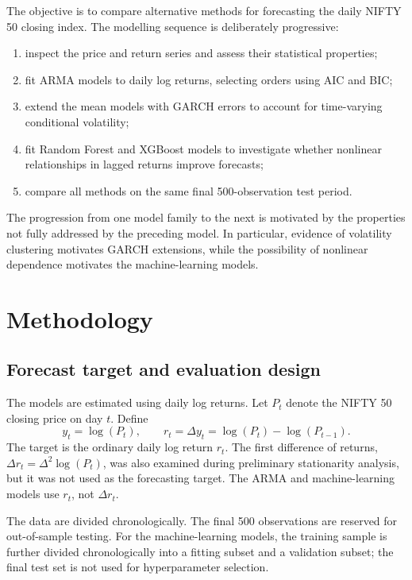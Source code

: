 \documentclass[10pt,a4paper]{article}
\begin{document}
The objective is to compare alternative methods for forecasting the daily NIFTY 50 closing index. The modelling sequence is deliberately progressive:
\begin{enumerate}[leftmargin=2em]
  \item inspect the price and return series and assess their statistical properties;
  \item fit ARMA models to daily log returns, selecting orders using AIC and BIC;
  \item extend the mean models with GARCH errors to account for time-varying conditional volatility;
  \item fit Random Forest and XGBoost models to investigate whether nonlinear relationships in lagged returns improve forecasts;
  \item compare all methods on the same final 500-observation test period.
\end{enumerate}

The progression from one model family to the next is motivated by the properties not fully addressed by the preceding model. In particular, evidence of volatility clustering motivates GARCH extensions, while the possibility of nonlinear dependence motivates the machine-learning models.

\section{Methodology}
\subsection{Forecast target and evaluation design}

The models are estimated using daily log returns. Let $P_t$ denote the NIFTY 50 closing price on day $t$. Define
\begin{equation}
  y_t=\log(P_t), \qquad
  r_t=\Delta y_t=\log(P_t)-\log(P_{t-1}).
  \label{eq:returns}
\end{equation}
The target is the ordinary daily log return $r_t$. The first difference of returns, $\Delta r_t=\Delta^2\log(P_t)$, was also examined during preliminary stationarity analysis, but it was not used as the forecasting target. The ARMA and machine-learning models use $r_t$, not $\Delta r_t$.

The data are divided chronologically. The final 500 observations are reserved for out-of-sample testing. For the machine-learning models, the training sample is further divided chronologically into a fitting subset and a validation subset; the final test set is not used for hyperparameter selection.
\end{document}
